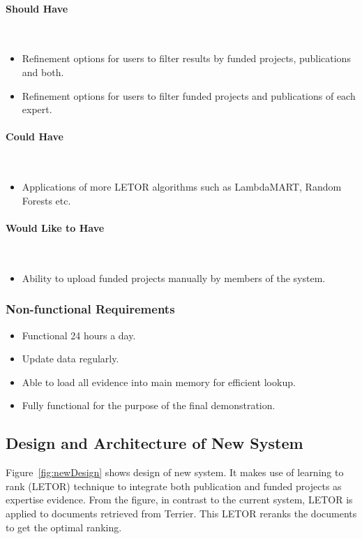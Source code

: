\paragraph{Should Have} \hspace{0pt} \\
\begin{itemize}
 \item Refinement options for users to filter results by funded projects, publications and both.
 \item Refinement options for users to filter funded projects and publications of each expert.
\end{itemize}

\paragraph{Could Have} \hspace{0pt} \\
\begin{itemize}
 \item Applications of more LETOR algorithms such as LambdaMART, Random Forests etc.
\end{itemize}

\paragraph{Would Like to Have} \hspace{0pt} \\
\begin{itemize}
 \item Ability to upload funded projects manually by members of the system.
\end{itemize}

\subsubsection{Non-functional Requirements}
\begin{itemize}
 \item Functional 24 hours a day.
 \item Update data regularly.
 \item Able to load all evidence into main memory for efficient lookup.
 \item Fully functional for the purpose of the final demonstration.
\end{itemize}

\subsection{Design and Architecture of New System} \label{section:union}
Figure~\ref{fig:newDesign} shows design of new system. It makes use of learning to rank (LETOR) technique to integrate 
both publication and funded projects as expertise evidence. From the figure, in contrast to the current system, 
LETOR is applied to documents retrieved from Terrier. This LETOR reranks the documents to get the optimal ranking.

